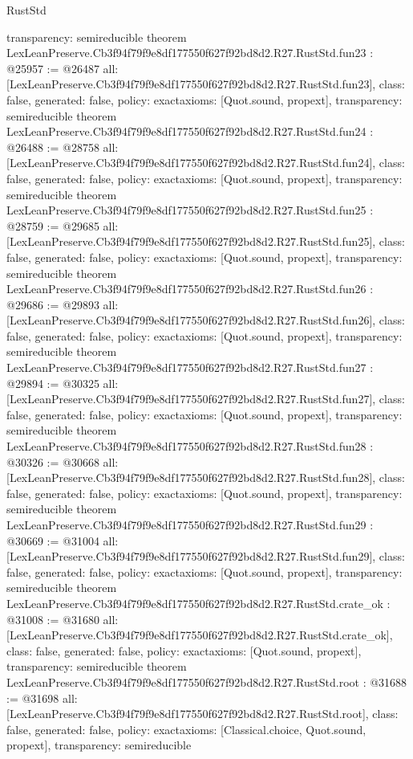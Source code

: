 \begin{lexlean}{RustStd}
\begin{coremodule}
{  transparency: semireducible
}
theorem LexLeanPreserve.Cb3f94f79f9e8df177550f627f92bd8d2.R27.RustStd.fun23 : @25957 := @26487 {
  all: [LexLeanPreserve.Cb3f94f79f9e8df177550f627f92bd8d2.R27.RustStd.fun23],
  class: false,
  generated: false,
  policy: exact{axioms: [Quot.sound, propext]},
  transparency: semireducible
}
theorem LexLeanPreserve.Cb3f94f79f9e8df177550f627f92bd8d2.R27.RustStd.fun24 : @26488 := @28758 {
  all: [LexLeanPreserve.Cb3f94f79f9e8df177550f627f92bd8d2.R27.RustStd.fun24],
  class: false,
  generated: false,
  policy: exact{axioms: [Quot.sound, propext]},
  transparency: semireducible
}
theorem LexLeanPreserve.Cb3f94f79f9e8df177550f627f92bd8d2.R27.RustStd.fun25 : @28759 := @29685 {
  all: [LexLeanPreserve.Cb3f94f79f9e8df177550f627f92bd8d2.R27.RustStd.fun25],
  class: false,
  generated: false,
  policy: exact{axioms: [Quot.sound, propext]},
  transparency: semireducible
}
theorem LexLeanPreserve.Cb3f94f79f9e8df177550f627f92bd8d2.R27.RustStd.fun26 : @29686 := @29893 {
  all: [LexLeanPreserve.Cb3f94f79f9e8df177550f627f92bd8d2.R27.RustStd.fun26],
  class: false,
  generated: false,
  policy: exact{axioms: [Quot.sound, propext]},
  transparency: semireducible
}
theorem LexLeanPreserve.Cb3f94f79f9e8df177550f627f92bd8d2.R27.RustStd.fun27 : @29894 := @30325 {
  all: [LexLeanPreserve.Cb3f94f79f9e8df177550f627f92bd8d2.R27.RustStd.fun27],
  class: false,
  generated: false,
  policy: exact{axioms: [Quot.sound, propext]},
  transparency: semireducible
}
theorem LexLeanPreserve.Cb3f94f79f9e8df177550f627f92bd8d2.R27.RustStd.fun28 : @30326 := @30668 {
  all: [LexLeanPreserve.Cb3f94f79f9e8df177550f627f92bd8d2.R27.RustStd.fun28],
  class: false,
  generated: false,
  policy: exact{axioms: [Quot.sound, propext]},
  transparency: semireducible
}
theorem LexLeanPreserve.Cb3f94f79f9e8df177550f627f92bd8d2.R27.RustStd.fun29 : @30669 := @31004 {
  all: [LexLeanPreserve.Cb3f94f79f9e8df177550f627f92bd8d2.R27.RustStd.fun29],
  class: false,
  generated: false,
  policy: exact{axioms: [Quot.sound, propext]},
  transparency: semireducible
}
theorem LexLeanPreserve.Cb3f94f79f9e8df177550f627f92bd8d2.R27.RustStd.crate_ok : @31008 := @31680 {
  all: [LexLeanPreserve.Cb3f94f79f9e8df177550f627f92bd8d2.R27.RustStd.crate_ok],
  class: false,
  generated: false,
  policy: exact{axioms: [Quot.sound, propext]},
  transparency: semireducible
}
theorem LexLeanPreserve.Cb3f94f79f9e8df177550f627f92bd8d2.R27.RustStd.root : @31688 := @31698 {
  all: [LexLeanPreserve.Cb3f94f79f9e8df177550f627f92bd8d2.R27.RustStd.root],
  class: false,
  generated: false,
  policy: exact{axioms: [Classical.choice, Quot.sound, propext]},
  transparency: semireducible
}


\end{coremodule}
\end{lexlean}
